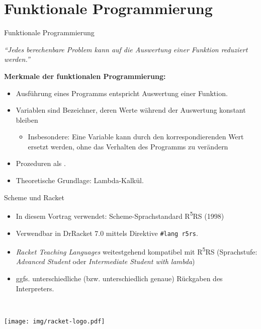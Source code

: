 \section{Funktionale Programmierung}
\begin{frame}[t]{Funktionale Programmierung} \label{folie:funktional}
	\begin{center} \small
		\textit{\enquote{Jedes berechenbare Problem kann auf die Auswertung einer Funktion reduziert werden.}} 
	\end{center}
	\textbf{Merkmale der funktionalen Programmierung:}
	\begin{itemize}
		\item Ausführung eines Programms entspricht Auswertung einer Funktion. 
		\item Variablen sind Bezeichner, deren Werte während der Auswertung konstant bleiben 
		\begin{itemize}
			\item Insbesondere: Eine Variable kann durch den korrespondierenden Wert ersetzt werden, ohne das Verhalten des Programms zu verändern 
		\end{itemize}
		\item Prozeduren als .
		\item Theoretische Grundlage: Lambda-Kalkül.
	\end{itemize}
\end{frame}

\begin{frame}[t,fragile]{Scheme und Racket}
	\begin{minipage}{0.6\textwidth}
	\begin{itemize}
		\item In diesem Vortrag verwendet: Scheme-Sprachstandard R\textsuperscript{5}RS (1998)
		\item Verwendbar in DrRacket 7.0 mittels Direktive \texttt{#lang r5rs}.
		\item \textit{Racket Teaching Languages} weitestgehend kompatibel mit R\textsuperscript{5}RS (Sprachstufe: \textit{Advanced Student} oder \textit{Intermediate Student with lambda})
		\item ggfs. unterschiedliche (bzw. unterschiedlich genaue) Rückgaben des Interpreters.
	\end{itemize}
	\end{minipage}~\hfill~
	\begin{minipage}{0.3\textwidth}
		\texttt{[image: img/racket-logo.pdf]}
	\end{minipage}
	
\end{frame}

